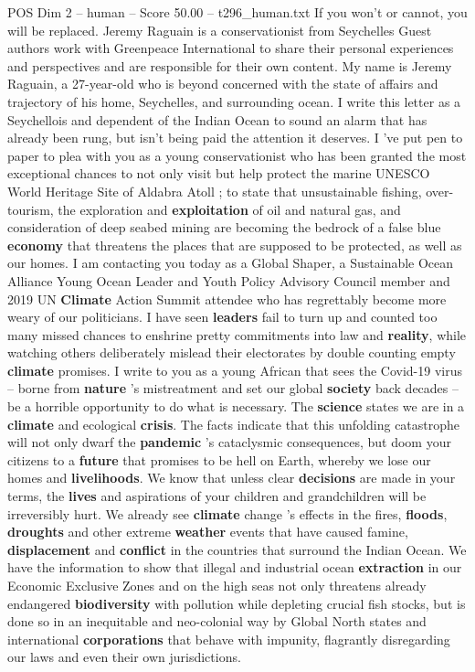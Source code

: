 \begin{textsample}{POS Dim 2 – human – Score 50.00 – t296\_human.txt}
If you won't or cannot, you will be replaced.
Jeremy Raguain is a conservationist from Seychelles Guest authors work with Greenpeace International to share their personal experiences and perspectives and are responsible for their own content.
My name is Jeremy Raguain, a 27-year-old who is beyond concerned with the state of affairs and trajectory of his home, Seychelles, and surrounding ocean.
I write this letter as a Seychellois and dependent of the Indian Ocean to sound an alarm that has already been rung, but isn't being paid the attention it deserves.
I ’ve put pen to paper to plea with you as a young conservationist who has been granted the most exceptional chances to not only visit but help protect the marine UNESCO World Heritage Site of Aldabra Atoll ; to state that unsustainable fishing, over-tourism, the exploration and \textbf{exploitation} of oil and natural gas, and consideration of deep seabed mining are becoming the bedrock of a false blue \textbf{economy} that threatens the places that are supposed to be protected, as well as our homes.
I am contacting you today as a Global Shaper, a Sustainable Ocean Alliance Young Ocean Leader and Youth Policy Advisory Council member and 2019 UN \textbf{Climate} Action Summit attendee who has regrettably become more weary of our politicians.
I have seen \textbf{leaders} fail to turn up and counted too many missed chances to enshrine pretty commitments into law and \textbf{reality}, while watching others deliberately mislead their electorates by double counting empty \textbf{climate} promises.
I write to you as a young African that sees the Covid-19 virus – borne from \textbf{nature} ’s mistreatment and set our global \textbf{society} back decades – be a horrible opportunity to do what is necessary.
The \textbf{science} states we are in a \textbf{climate} and ecological \textbf{crisis}.
The facts indicate that this unfolding catastrophe will not only dwarf the \textbf{pandemic} ’s cataclysmic consequences, but doom your citizens to a \textbf{future} that promises to be hell on Earth, whereby we lose our homes and \textbf{livelihoods}.
We know that unless clear \textbf{decisions} are made in your terms, the \textbf{lives} and aspirations of your children and grandchildren will be irreversibly hurt.
We already see \textbf{climate} change ’s effects in the fires, \textbf{floods}, \textbf{droughts} and other extreme \textbf{weather} events that have caused famine, \textbf{displacement} and \textbf{conflict} in the countries that surround the Indian Ocean.
We have the information to show that illegal and industrial ocean \textbf{extraction} in our Economic Exclusive Zones and on the high seas not only threatens already endangered \textbf{biodiversity} with pollution while depleting crucial fish stocks, but is done so in an inequitable and neo-colonial way by Global North states and international \textbf{corporations} that behave with impunity, flagrantly disregarding our laws and even their own jurisdictions.

\end{textsample}
